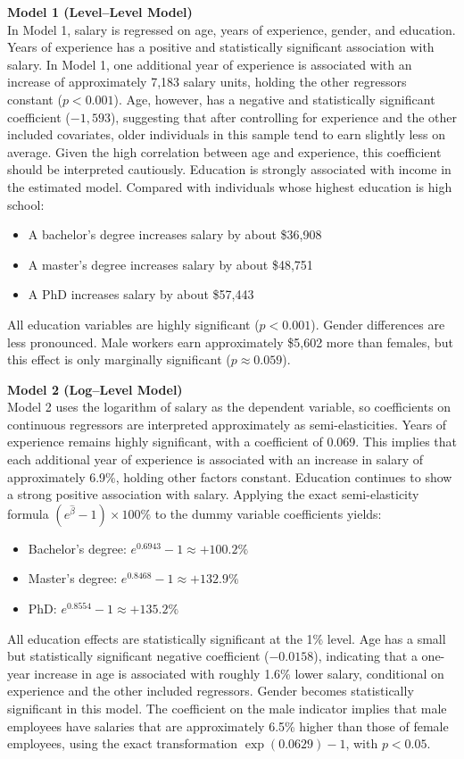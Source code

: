 \documentclass[12pt, a4paper]{article}
\begin{document}
\textbf{Model 1 (Level--Level Model)}\\
In Model 1, salary is regressed on age, years of experience, gender, and education.
Years of experience has a positive and statistically significant association with salary. In Model 1, one additional year of experience is associated with an increase of approximately 7,183 salary units, holding the other regressors constant ($p < 0.001$).
Age, however, has a negative and statistically significant coefficient ($-1,593$), suggesting that after controlling for experience and the other included covariates, older individuals in this sample tend to earn slightly less on average. Given the high correlation between age and experience, this coefficient should be interpreted cautiously.
Education is strongly associated with income in the estimated model. Compared with individuals whose highest education is high school:
\begin{itemize}
  \item A bachelor's degree increases salary by about \$36,908
  \item A master's degree increases salary by about \$48,751
  \item A PhD increases salary by about \$57,443
\end{itemize}
All education variables are highly significant ($p < 0.001$).
Gender differences are less pronounced. Male workers earn approximately \$5,602 more than females, but this effect is only marginally significant ($p \approx 0.059$).

\vspace{1em}
\textbf{Model 2 (Log--Level Model)}\\
Model 2 uses the logarithm of salary as the dependent variable, so coefficients on continuous regressors are interpreted approximately as semi-elasticities.
Years of experience remains highly significant, with a coefficient of 0.069. This implies that each additional year of experience is associated with an increase in salary of approximately 6.9\%, holding other factors constant.
Education continues to show a strong positive association with salary. Applying the exact semi-elasticity formula $\left(e^{\hat{\beta}} - 1\right) \times 100\%$ to the dummy variable coefficients yields:
\begin{itemize}
  \item Bachelor's degree: $e^{0.6943} - 1 \approx +100.2\%$
  \item Master's degree: $e^{0.8468} - 1 \approx +132.9\%$
  \item PhD: $e^{0.8554} - 1 \approx +135.2\%$
\end{itemize}
All education effects are statistically significant at the 1\% level.
Age has a small but statistically significant negative coefficient ($-0.0158$), indicating that a one-year increase in age is associated with roughly 1.6\% lower salary, conditional on experience and the other included regressors.
Gender becomes statistically significant in this model. The coefficient on the male indicator implies that male employees have salaries that are approximately 6.5\% higher than those of female employees, using the exact transformation $\exp(0.0629)-1$, with $p < 0.05$.
\end{document}
